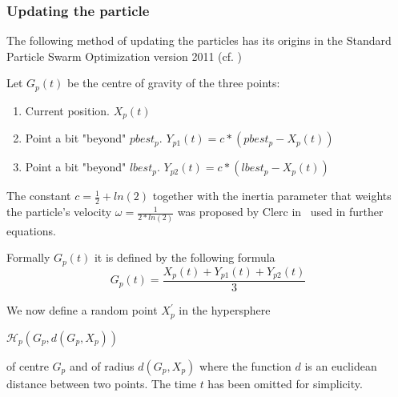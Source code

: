 \documentclass[runningheads,a4paper]{llncs}
\begin{document}
\subsubsection{Updating the particle}




%	

The following method of updating the particles has its origins in the Standard Particle Swarm Optimization version 2011 (cf. \cite{pso_11})

Let $G_p(t)$ be the centre of gravity of the three points:
\begin{enumerate}
	\item Current position. $X_p(t)$
	
	\item Point a bit "beyond" $pbest_p$. $Y_{p1}(t) = c*(pbest_p-X_p(t))$
	
	\item Point a bit "beyond" $lbest_p$. $Y_{p2}(t) = c*(lbest_p-X_p(t))$
			
\end{enumerate}

The constant $c = \frac{1}{2} + ln(2)$ together with the inertia parameter that weights the particle's velocity $\omega = \frac{1}{2 * ln(2)}$ was proposed by Clerc in~\cite{pso_anal}  used in further equations. 

Formally $G_p(t)$ it is defined by the following formula 
\begin{equation}
	G_p(t) = \frac{X_p(t) + Y_{p1}(t) + Y_{p2}(t)} {3}
\end{equation}

We now define a random point $X^{'}_p$ in the hypersphere
\begin{center}
	$\mathcal{H}_p(G_p, d(G_p, X_p))$ 
\end{center}
of centre $G_p$ and of radius $d(G_p, X_p)$ where the function $d$ is an euclidean distance between two points. The time $t$ has been omitted for simplicity.
\end{document}
